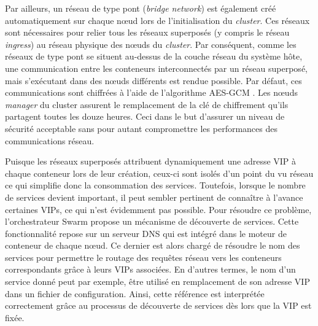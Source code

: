 Par ailleurs, un réseau de type pont (\textit{bridge network}) est également créé automatiquement sur chaque n\oe{}ud lors de l'initialisation du \textit{cluster}. Ces réseaux sont nécessaires pour relier tous les réseaux superposés (y compris le réseau \textit{ingress}) au réseau physique des n\oe{}uds du \textit{cluster}. Par conséquent, comme les réseaux de type pont se situent au-dessus de la couche réseau du système hôte, une communication entre les conteneurs interconnectés par un réseau superposé, mais s'exécutant dans des n\oe{}uds différents est rendue possible. Par défaut, ces communications sont chiffrées à l'aide de l'algorithme AES-GCM \citep{rfc5288}. Les n\oe{}uds \textit{manager} du cluster assurent le remplacement de la clé de chiffrement qu'ils partagent toutes les douze heures. Ceci dans le but d'assurer un niveau de sécurité acceptable sans pour autant compromettre les performances des communications réseau.

Puisque les réseaux superposés attribuent dynamiquement une adresse \acl{VIP} à chaque conteneur lors de leur création, ceux-ci sont isolés d'un point du vu réseau ce qui simplifie donc la consommation des services. Toutefois, lorsque le nombre de services devient important, il peut sembler pertinent de connaître à l'avance certaines \acsp{VIP}, ce qui n'est évidemment pas possible. Pour résoudre ce problème, l'orchestrateur Swarm propose un mécanisme de découverte de services. Cette fonctionnalité repose sur un serveur DNS qui est intégré dans le moteur de conteneur de chaque n\oe{}ud. Ce dernier est alors chargé de résoudre le nom des services pour permettre le routage des requêtes réseau vers les conteneurs correspondants grâce à leurs \acsp{VIP} associées.  En d'autres termes, le nom d'un service donné peut par exemple, être utilisé en remplacement de son adresse \acl{VIP} dans un fichier de configuration. Ainsi, cette référence est interprétée correctement grâce au processus de découverte de services dès lors que la \acs{VIP} est fixée.

